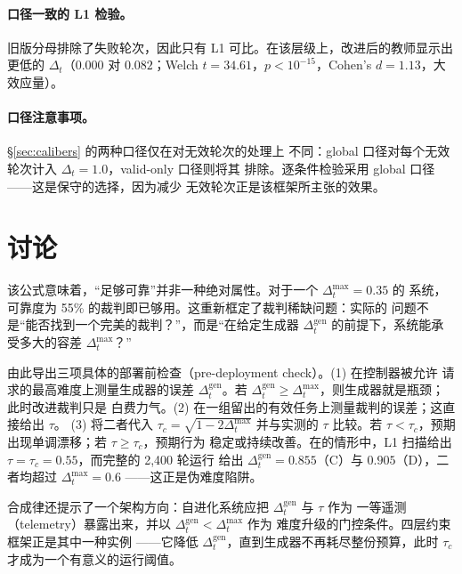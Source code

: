 \documentclass{article}
\begin{document}
\paragraph{口径一致的 L1 检验。} 旧版分母排除了失败轮次，因此只有 L1
可比。在该层级上，改进后的教师显示出更低的 $\Delta_t$（$0.000$ 对 $0.082$；Welch
$t = 34.61$，$p < 10^{-15}$，Cohen's $d = 1.13$，大效应量）。

\paragraph{口径注意事项。} \S\ref{sec:calibers} 的两种口径仅在对无效轮次的处理上
不同：global 口径对每个无效轮次计入 $\Delta_t = 1.0$，valid-only 口径则将其
排除。逐条件检验采用 global 口径——这是保守的选择，因为减少
无效轮次正是该框架所主张的效果。

\section{讨论}

该公式意味着，“足够可靠”并非一种绝对属性。对于一个 $\Delta_t^{\max} = 0.35$ 的
系统，可靠度为 55\% 的裁判即已够用。这重新框定了裁判稀缺问题：实际的
问题不是“能否找到一个完美的裁判？”，而是“在给定生成器
$\Delta_t^{\mathrm{gen}}$ 的前提下，系统能承受多大的容差 $\Delta_t^{\max}$？”

由此导出三项具体的部署前检查（pre-deployment check）。(1) 在控制器被允许
请求的最高难度上测量生成器的误差 $\Delta_t^{\mathrm{gen}}$。若
$\Delta_t^{\mathrm{gen}} \ge \Delta_t^{\max}$，则生成器就是瓶颈；此时改进裁判只是
白费力气。(2) 在一组留出的有效任务上测量裁判的误差；这直接给出 $\tau$。
(3) 将二者代入 $\tau_c = \sqrt{1 - 2\Delta_t^{\max}}$ 并与实测的
$\tau$ 比较。若 $\tau < \tau_c$，预期出现单调漂移；若 $\tau \ge \tau_c$，预期行为
稳定或持续改善。在的情形中，L1 扫描给出 $\tau = \tau_c = 0.55$，而完整的 2,400 轮运行
给出 $\Delta_t^{\mathrm{gen}} = 0.855$（C）与 $0.905$（D），二者均超过 $\Delta_t^{\max} = 0.6$
——这正是伪难度陷阱。

合成律还提示了一个架构方向：自进化系统应把 $\Delta_t^{\mathrm{gen}}$ 与 $\tau$ 作为
一等遥测（telemetry）暴露出来，并以 $\Delta_t^{\mathrm{gen}} < \Delta_t^{\max}$ 作为
难度升级的门控条件。四层约束框架正是其中一种实例
——它降低 $\Delta_t^{\mathrm{gen}}$，直到生成器不再耗尽整份预算，此时
$\tau_c$ 才成为一个有意义的运行阈值。
\end{document}

